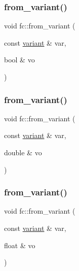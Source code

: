 \mbox{\label{namespacefc_a21d4ea52acb517fca8ab7b2f86bae8a7}} 
\subsubsection{\texorpdfstring{from\+\_\+variant()}{from\_variant()}\hspace{0.1cm}{\footnotesize\ttfamily [13/17]}}
{\footnotesize\ttfamily void fc\+::from\+\_\+variant (\begin{DoxyParamCaption}\item[{const \mbox{\hyperlink{classfc_1_1variant}{variant}} \&}]{var,  }\item[{bool \&}]{vo }\end{DoxyParamCaption})}

\mbox{\label{namespacefc_aa583ba2127ff75e36f979b70a3aee07f}} 
\subsubsection{\texorpdfstring{from\+\_\+variant()}{from\_variant()}\hspace{0.1cm}{\footnotesize\ttfamily [14/17]}}
{\footnotesize\ttfamily void fc\+::from\+\_\+variant (\begin{DoxyParamCaption}\item[{const \mbox{\hyperlink{classfc_1_1variant}{variant}} \&}]{var,  }\item[{double \&}]{vo }\end{DoxyParamCaption})}

\mbox{\label{namespacefc_ae1f4caaaa50959b0a3bc8310760c8094}} 
\subsubsection{\texorpdfstring{from\+\_\+variant()}{from\_variant()}\hspace{0.1cm}{\footnotesize\ttfamily [15/17]}}
{\footnotesize\ttfamily void fc\+::from\+\_\+variant (\begin{DoxyParamCaption}\item[{const \mbox{\hyperlink{classfc_1_1variant}{variant}} \&}]{var,  }\item[{float \&}]{vo }\end{DoxyParamCaption})}

